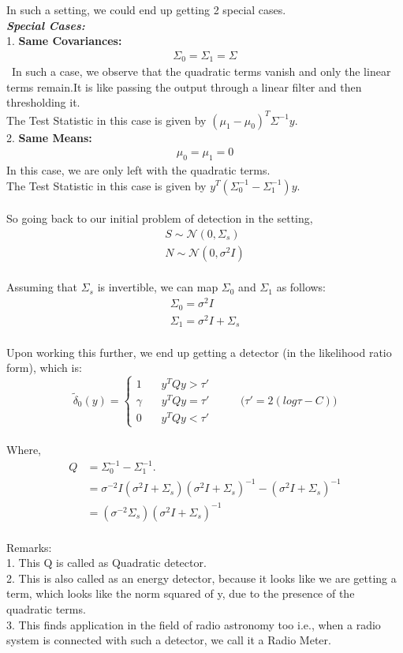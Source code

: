 \documentclass[a4paper,english,12pt]{article}
\begin{document}
In such a setting, we could end up getting 2 special cases.\\
\textbf{\textit{Special Cases:}}\\
1. \textbf{Same Covariances:} \\
\begin{align*}
\Sigma_0 = \Sigma_1 =\Sigma
\end{align*}\
In such a case, we observe that the quadratic terms vanish and only the linear terms remain.It is like passing the output through a linear filter and then thresholding it.\\
The Test Statistic in this case is given by
$(\mu_1-\mu_0)^T\Sigma^{-1}y$.\\
2. \textbf{Same Means:} \\
\begin{align*}
\mu_0 = \mu_1 = 0
\end{align*}
In this case, we are only left with the quadratic terms.\\
The Test Statistic in this case is given by
$y^T(\Sigma_0^{-1}-\Sigma_1^{-1})y$.\\
\\So going back to our initial problem of detection in the setting, 
\begin{align*}  
S\sim \mathcal{N}(0,\Sigma_s)
\\N\sim \mathcal{N}(0,\sigma^2I)
\end{align*}\\
Assuming that $\Sigma_s$ is invertible, we can map $\Sigma_0$ and $\Sigma_1$ as follows:
\begin{align*}  
\Sigma_0 = \sigma^2I\\
\Sigma_1 = \sigma^2I + \Sigma_s
\end{align*}
\\Upon working this further, we end up getting a detector (in the likelihood ratio form), which is:
\begin{equation*}
\tilde\delta_0(y)=
\begin{cases}
	1 \ \ \ \ \ \ \ \ y^TQy>\tau'\\
	\gamma \ \ \ \ \ \ \ \ y^TQy=\tau'\\
	0 \ \ \ \ \ \ \ \ y^TQy<\tau'
\end{cases}  \ \ \ \ \ \ \ \ \ \ \ \bigg(\tau'=2(log\tau-C)\bigg)
\end{equation*}
\\ Where, 
\begin{align*}
 Q&=\Sigma_0^{-1}-\Sigma_1^{-1}.\\
 &=\sigma^{-2}I(\sigma^{2}I+\Sigma_s)(\sigma^{2}I+\Sigma_s)^{-1}-(\sigma^{2}I+\Sigma_s)^{-1}\\
 &=(\sigma^{-2}\Sigma_s)(\sigma^{2}I+\Sigma_s)^{-1}
  \end{align*}
 \\Remarks:
 \\1. This Q is called as Quadratic detector.
 \\2. This is also called as an energy detector, because it looks like we are getting a term, which looks like the norm squared of y, due to the presence of the quadratic terms.
 \\3. This finds application in the field of radio astronomy too i.e., when a radio system is connected with such a detector, we call it a Radio Meter.
\end{document}
